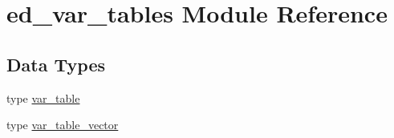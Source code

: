 \hypertarget{namespaceed__var__tables}{}\section{ed\+\_\+var\+\_\+tables Module Reference}
\label{namespaceed__var__tables}
\subsection*{Data Types}
\begin{DoxyCompactItemize}
\item 
type \hyperlink{structed__var__tables_1_1var__table}{var\+\_\+table}
\item 
type \hyperlink{structed__var__tables_1_1var__table__vector}{var\+\_\+table\+\_\+vector}
\end{DoxyCompactItemize}
